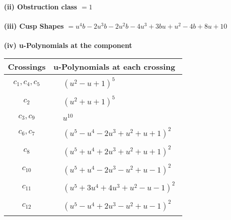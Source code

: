 \documentclass[1p]{elsarticle_modified}
\theoremstyle{definition}
\begin{document}
\flushleft \textbf{(ii) Obstruction class $= 1$}\\~\\
\flushleft \textbf{(iii) Cusp Shapes $= u^4 b-2 u^3 b-2 u^2 b-4 u^3+3 b u+u^2-4 b+8 u+10$}\\~\\
\newpage\renewcommand{\arraystretch}{1}
\flushleft \textbf{(iv) u-Polynomials at the component}\newline \\
\begin{tabular}{m{50pt}|m{274pt}}
Crossings & \hspace{64pt}u-Polynomials at each crossing \\
\hline $$\begin{aligned}c_{1},c_{4},c_{5}\end{aligned}$$&$\begin{aligned}
&(u^2- u+1)^5
\end{aligned}$\\
\hline $$\begin{aligned}c_{2}\end{aligned}$$&$\begin{aligned}
&(u^2+u+1)^5
\end{aligned}$\\
\hline $$\begin{aligned}c_{3},c_{9}\end{aligned}$$&$\begin{aligned}
&u^{10}
\end{aligned}$\\
\hline $$\begin{aligned}c_{6},c_{7}\end{aligned}$$&$\begin{aligned}
&(u^5- u^4-2 u^3+u^2+u+1)^2
\end{aligned}$\\
\hline $$\begin{aligned}c_{8}\end{aligned}$$&$\begin{aligned}
&(u^5+u^4+2 u^3+u^2+u+1)^2
\end{aligned}$\\
\hline $$\begin{aligned}c_{10}\end{aligned}$$&$\begin{aligned}
&(u^5+u^4-2 u^3- u^2+u-1)^2
\end{aligned}$\\
\hline $$\begin{aligned}c_{11}\end{aligned}$$&$\begin{aligned}
&(u^5+3 u^4+4 u^3+u^2- u-1)^2
\end{aligned}$\\
\hline $$\begin{aligned}c_{12}\end{aligned}$$&$\begin{aligned}
&(u^5- u^4+2 u^3- u^2+u-1)^2
\end{aligned}$\\
\hline
\end{tabular}\\~\\
\end{document}
